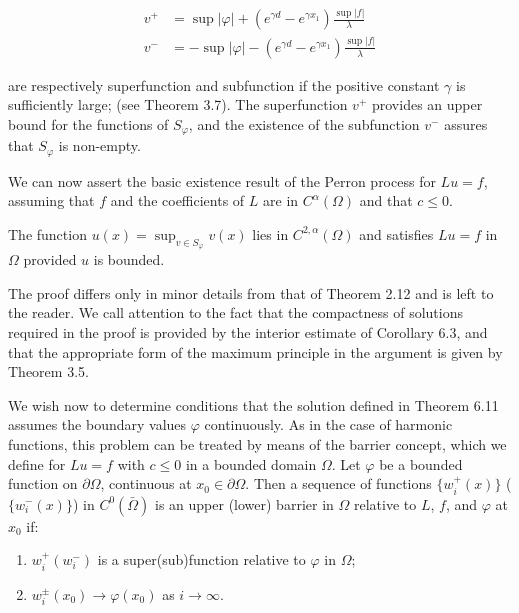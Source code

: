 \begin{equation}
\tag{6.44}
\begin{aligned}
v^+ &= \sup |\varphi| + (e^{\gamma d} - e^{\gamma x_1}) \frac{\sup |f|}{\lambda} \\
v^- &= -\sup |\varphi| - (e^{\gamma d} - e^{\gamma x_1}) \frac{\sup |f|}{\lambda}
\end{aligned}
\end{equation}

are respectively superfunction and subfunction if the positive constant $\gamma$ is sufficiently
large; (see Theorem 3.7). The superfunction $v^+$ provides an upper bound for the
functions of $S_\varphi$, and the existence of the subfunction $v^-$ assures that $S_\varphi$ is
non-empty.

We can now assert the basic existence result of the Perron process for $Lu = f$,
assuming that $f$ and the coefficients of $L$ are in $C^\alpha(\Omega)$ and that $c \le 0$.

\begin{theorem}[6.11]
The function $u(x) = \sup_{v \in S_\varphi} v(x)$ lies in $C^{2,\alpha}(\Omega)$ and satisfies $Lu = f$
in $\Omega$ provided $u$ is bounded.
\end{theorem}

The proof differs only in minor details from that of Theorem 2.12 and is left to
the reader. We call attention to the fact that the compactness of solutions required
in the proof is provided by the interior estimate of Corollary 6.3, and that the
appropriate form of the maximum principle in the argument is given by Theorem 3.5.



We wish now to determine conditions that the solution defined in Theorem 6.11 assumes the boundary values $\varphi$ continuously. As in the case of harmonic functions, this problem can be treated by means of the barrier concept, which we define for $Lu=f$ with $c\le 0$ in a bounded domain $\Omega$. Let $\varphi$ be a bounded function on $\partial\Omega$, continuous at $x_0\in \partial\Omega$. Then a sequence of functions $\{w_i^+(x)\}$ ($\{w_i^-(x)\}$) in $C^0(\bar{\Omega})$ is an upper (lower) barrier in $\Omega$ relative to $L$, $f$, and $\varphi$ at $x_0$ if:

\begin{enumerate}
\item[(i)] $w_i^+ (w_i^-)$ is a super(sub)function relative to $\varphi$ in $\Omega$;
\item[(ii)] $w_i^\pm(x_0)\to \varphi(x_0)$ as $i\to \infty$.
\end{enumerate}

